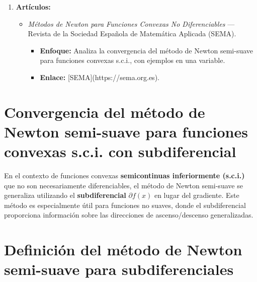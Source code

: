 \documentclass[12pt]{book}
\theoremstyle{definition}
\theoremstyle{plain}
\theoremstyle{remark}
\begin{document}
\begin{enumerate}
\begin{itemize}
        \item \textit{Curso de Optimización Convexa y No Diferenciable} — Universidad Nacional Autónoma de México (UNAM).
          \begin{itemize}
            \item \textbf{Contenido:} Aborda el método de Newton semi-suave para subdiferenciales, con ejemplos en \( \mathbb{R} \) y análisis de convergencia.
            \item \textbf{Enlace:}
            
            \footnotesize
            [IMUNAM - Optimización](https://www.matem.unam.mx). \normalsize
          \end{itemize}
      \end{itemize}

    \item \textbf{Artículos:}
      \begin{itemize}
        \item \textit{Métodos de Newton para Funciones Convexas No Diferenciables} — Revista de la Sociedad Española de Matemática Aplicada (SEMA).
          \begin{itemize}
            \item \textbf{Enfoque:} Analiza la convergencia del método de Newton semi-suave para funciones convexas s.c.i., con ejemplos en una variable.
            \item \textbf{Enlace:} [SEMA](https://sema.org.es).
          \end{itemize}
      \end{itemize}
\end{enumerate}

\section*{Convergencia del método de Newton semi-suave para funciones convexas s.c.i. con subdiferencial}

En el contexto de funciones convexas \textbf{semicontinuas inferiormente (s.c.i.)} que no son necesariamente diferenciables, el método de Newton semi-suave se generaliza utilizando el \textbf{subdiferencial} \( \partial f(x) \) en lugar del gradiente. Este método es especialmente útil para funciones no suaves, donde el subdiferencial proporciona información sobre las direcciones de ascenso/descenso generalizadas.

\section*{Definición del método de Newton semi-suave para subdiferenciales}
\end{document}
